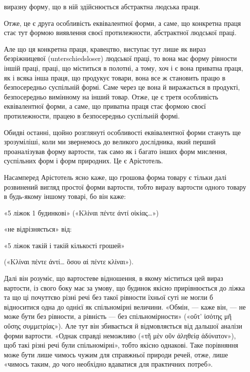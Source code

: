 \parcont{}  %
виразну форму, що в ній здійснюється абстрактна людська праця.

Отже, це є друга особливість еквівалентної форми, а саме, що конкретна праця стає тут формою
виявлення своєї протилежности,
абстрактної людської праці.

Але що ця конкретна праця, кравецтво, виступає тут лише як вираз безріжницевої (unterschiedsloser)
людської праці, то вона має форму рівности іншій праці, праці, що міститься в полотні, а тому, хоч і
є вона приватна праця, як і всяка інша праця, що продукує товари, вона все ж становить працю в
безпосередньо суспільній формі. Саме через це вона й виражається в продукті, безпосередньо вимінному
на інший товар. Отже, це є третя особливість еквівалентної форми, а саме, що приватна праця стає
формою своєї протилежности, працею в безпосередньо суспільній формі.

Обидві останні, щойно розглянуті особливості еквівалентної форми стануть ще зрозуміліші, коли ми
звернемось до великого дослідника, який перший проаналізував форму вартости, так само як і багато
інших форм мислення, суспільних форм і форм природних. Це є Арістотель.

Насамперед Арістотель ясно каже, що грошова форма товару є тільки далі розвинений вигляд простої
форми вартости, тобто виразу вартости одного товару в будь-якому іншому товарі, бо він каже:

\noindent{}\begin{minipage}{\textwidth}
\begin{center}
«5 ліжок \deq{} 1 будинкові»
(«\textgreek{Κλίναι πέντε άντί οἰκίας\dots{}}»)

«не відрізняється» від:

«5 ліжок \deq{} такій і такій кількості грошей»

(«\textgreek{Κλίναι πέντε άντί\dots{} ὃσου αἱ πέντε κλίναι}»).
\end{center}
\medskip
\end{minipage}

\noindent{}Далі він розуміє, що вартостеве відношення, в якому міститься цей вираз вартости, із свого боку має
за умову, що будинок якісно прирівнюється до ліжка та що ці почуттєво різні речі без такої рівности
їхньої суті не могли б відноситися одна до однієї як спільномірні величини. «Обмін, — каже він, — не
може бути без рівности, а рівність — без спільномірности» («\textgreek{οὔτ' ἰσότης μῆ οὔσης συμμετρίας}»). Але
тут він збивається й відмовляється від дальшої аналізи форми вартости. «Однак справді неможливо
(«\textgreek{τῆ μὲν οῦν ἀληθείᾳ ἀδύνατον}»), щоб такі різні речі були спільномірні», тобто якісно однакові. Таке
порівняння може бути лише чимось чужим для справжньої природи речей, отже, лише «чимось таким, до
чого необхідно вдаватися для практичних потреб».

